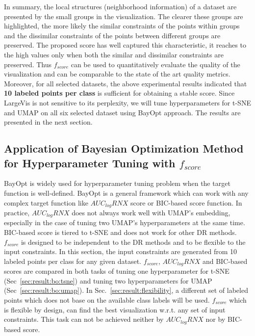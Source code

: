 In summary, the local structures (neighborhood information) of a dataset are presented by the small groups in the visualization.
The clearer these groups are highlighted, the more likely the similar constraints of the points within groups and the dissimilar constraints of the points between different groups are preserved.
The proposed score has well captured this characteristic,  it reaches to the high values only when both the similar and dissimilar constraints are preserved.
Thus $f_{score}$ can be used to quantitatively evaluate the quality of the visualization and can be comparable to the state of the art quality metrics.
Moreover, for all selected datasets, the above experimental results indicated that {\bf 10 labeled points per class} is sufficient for obtaining a stable score.
Since LargeVis is not sensitive to its perplexity, we will tune hyperparameters for t-SNE and UMAP on all six selected dataset using BayOpt approach.
The results are presented in the next section.


\subsection{Application of Bayesian Optimization Method for Hyperparameter Tuning with $f_{score}$}\label{sec:result:bo}
BayOpt is widely used for hyperparameter tuning problem when the target function is well-defined.
BayOpt is a general framework which can work with any complex target function like $AUC_{log}RNX$ score or BIC-based score function.
In practice, $AUC_{log}RNX$ does not always work well with UMAP's embedding, especially in the case of tuning two UMAP's hyperparameters at the same time.
BIC-based score is tiered to t-SNE and does not work for other DR methods.
$f_{score}$ is designed to be independent to the DR methods and to be flexible to the input constraints.
In this section, the input constraints are generated from 10 labeled points per class for any given dataset.
$f_{score}$, $AUC_{log}RNX$ and BIC-based scores are compared in both tasks of tuning one hyperparameter for t-SNE (Sec~\ref{sec:result:bo:tsne}) and tuning two hyperparameters for UMAP (Sec~\ref{sec:result:bo:umap}).
In Sec.~\ref{sec:result:flexibility}, a different set of labeled points which does not base on the available class labels will be used.
$f_{score}$ which is flexible by design, can find the best visualization w.r.t. any set of input constraints.
This task can not be achieved neither by $AUC_{log}RNX$ nor by BIC-based score.

